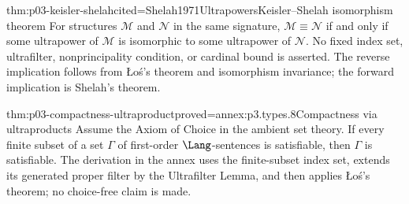 \begin{hbtheorem}{thm:p03-keisler-shelah}{cited=Shelah1971Ultrapowers}{Keisler--Shelah isomorphism theorem}
For structures \(\mathcal M\) and \(\mathcal N\) in the same signature,
\(\mathcal M\equiv\mathcal N\) if and only if some ultrapower of
\(\mathcal M\) is isomorphic to some ultrapower of \(\mathcal N\).
No fixed index set, ultrafilter, nonprincipality condition, or cardinal bound
is asserted.  The reverse implication follows from \L o\'s's theorem and
isomorphism invariance; the forward implication is Shelah's theorem.
\end{hbtheorem}

\begin{hbtheorem}{thm:p03-compactness-ultraproduct}{proved=annex:p3.types.8}{Compactness via ultraproducts}
Assume the Axiom of Choice in the ambient set theory.  If every finite subset
of a set \(\Gamma\) of first-order \(\Lang\)-sentences is satisfiable, then
\(\Gamma\) is satisfiable.  The derivation in the annex uses the finite-subset
index set, extends its generated proper filter by the Ultrafilter Lemma, and
then applies \L o\'s's theorem; no choice-free claim is made.
\end{hbtheorem}

